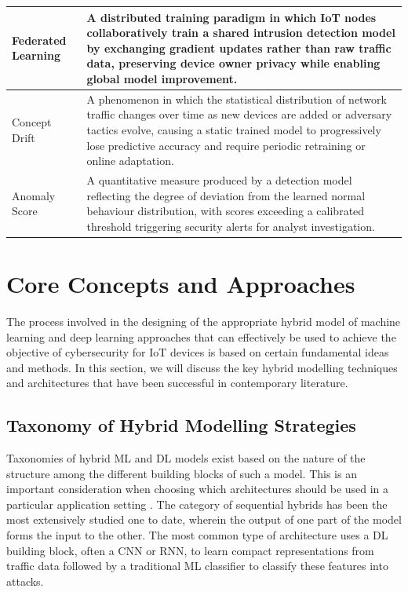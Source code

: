 \documentclass[12pt]{article}
\begin{document}
\begin{table}[H]
\begin{tabular}{|p{3.5cm}|p{9.5cm}|}
        \hline
        Federated Learning &
          A distributed training paradigm in which IoT nodes collaboratively train a shared intrusion detection model by exchanging gradient updates rather than raw traffic data, preserving device owner privacy while enabling global model improvement. \\
        \hline
        Concept Drift &
          A phenomenon in which the statistical distribution of network traffic changes over time as new devices are added or adversary tactics evolve, causing a static trained model to progressively lose predictive accuracy and require periodic retraining or online adaptation. \\
        \hline
        Anomaly Score &
          A quantitative measure produced by a detection model reflecting the degree of deviation from the learned normal behaviour distribution, with scores exceeding a calibrated threshold triggering security alerts for analyst investigation. \\
        \hline
    \end{tabular}
\end{table}


\section{Core Concepts and Approaches}

The process involved in the designing of the appropriate hybrid model of machine learning and deep learning approaches that can effectively be used to achieve the objective of cybersecurity for IoT devices is based on certain fundamental ideas and methods. In this section, we will discuss the key hybrid modelling techniques and architectures that have been successful in contemporary literature.

\subsection{Taxonomy of Hybrid Modelling Strategies}

Taxonomies of hybrid ML and DL models exist based on the nature of the structure among the different building blocks of such a model. This is an important consideration when choosing which architectures should be used in a particular application setting \cite{zhang2019hybrid}. The category of sequential hybrids has been the most extensively studied one to date, wherein the output of one part of the model forms the input to the other. The most common type of architecture uses a DL building block, often a CNN or RNN, to learn compact representations from traffic data followed by a traditional ML classifier to classify these features into attacks.
\end{document}
